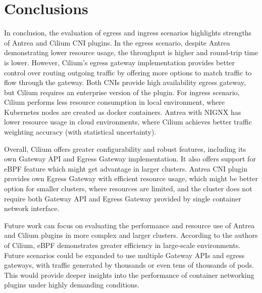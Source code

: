 

\chapter{Conclusions}
\label{char:conclusions}

In conclusion, the evaluation of egress and ingress scenarios highlights strengths of Antrea and Cilium CNI plugins. In the egress scenario, despite Antrea demonstrating lower resource usage, the throughput is higher and round-trip time is lower. However, Cilium's egress gateway implementation provides better control over routing outgoing traffic by offering more options to match traffic to flow through the gateway. Both CNIs provide high availability egress gateway, but Cilium requires an enterprise version of the plugin. For ingress scenario, Cilium performs less resource consumption in local environment, where Kubernetes nodes are created as docker containers. Antrea with NIGNX has lower resource usage in cloud environments, where Cilium achieves better traffic weighting accuracy (with statistical uncertainty). 

 

Overall, Cilium offers greater configurability and robust features, including its own Gateway API and Egress Gateway implementation. It also offers support for eBPF feature which might get advantage in larger clusters. Antrea CNI plugin provides own Egress Gateway with efficient resource usage, which might be better option for smaller clusters, where resources are limited, and the cluster does not require both Gateway API and Egress Gateway provided by single container network interface. 

 

Future work can focus on evaluating the performance and resource use of Antrea and Cilium plugins in more complex and larger clusters. According to the authors of Cilium, eBPF demonstrates greater efficiency in large-scale environments. Future scenarios could be expanded to use multiple Gateway APIs and egress gateways, with traffic generated by thousands or even tens of thousands of pods. This would provide deeper insights into the performance of container networking plugins under highly demanding conditions. 
